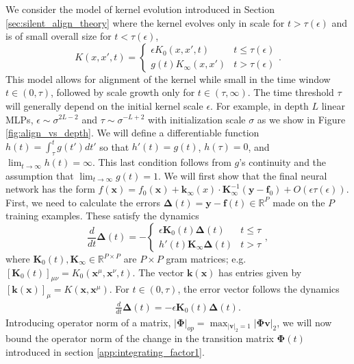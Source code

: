 \documentclass{article} %
\def\x{\bm x}
\begin{document}
\begin{appendix}
We consider the model of kernel evolution introduced in Section \ref{sec:silent_align_theory} where the kernel evolves only in scale for $t > \tau(\epsilon)$ and is of small overall size for $t < \tau(\epsilon)$,
\begin{equation}\label{eq:cases}
    K(x,x',t) = \begin{cases} 
      \epsilon K_0(x,x',t) & t \leq \tau(\epsilon) \\
      g(t) K_{\infty}(x,x') & t > \tau(\epsilon)
   \end{cases}.
\end{equation}
This model allows for alignment of the kernel while small in the time window $t \in (0,\tau)$, followed by scale growth only for $t \in (\tau,\infty)$. The time threshold $\tau$ will generally depend on the initial kernel scale $\epsilon$. For example, in depth $L$ linear MLPs, $\epsilon \sim \sigma^{2L-2}$ and $\tau \sim \sigma^{-L+2}$ with initialization scale $\sigma$ as we show in Figure \ref{fig:align_vs_depth}. We will define a differentiable function $h(t) = \int_{\tau}^t  g(t') dt'$ so that $h'(t) = g(t)$, $h(\tau) = 0$, and $\lim_{t\to\infty} h(t) = \infty$. This last condition follows from $g$'s continuity and the assumption that $\lim_{t\to\infty} g(t) = 1$. We will first show that the final neural network has the form $f(\x) = f_0(\x) +  \bm k_{\infty}(x) \cdot \bm K_{\infty}^{-1} (\bm y - \bm f_0) + O(\epsilon \tau(\epsilon))$. First, we need to calculate the errors $\bm\Delta(t) = \bm y - \bm f(t) \in \mathbb{R}^P$ made on the $P$ training examples. These satisfy the dynamics
\begin{equation}
    \frac{d}{dt} \bm \Delta(t)  = - \begin{cases} 
      \epsilon \bm K_0(t) \bm \Delta(t)  & t \leq \tau \\
      h'(t) \bm K_{\infty} \bm\Delta(t) & t > \tau
   \end{cases},
\end{equation}
where $\bm K_0(t), \bm K_{\infty} \in \mathbb{R}^{P \times P}$ are $P\times P$ gram matrices; e.g. $[\bm K_{0}(t)]_{\mu \nu} = K_0(\x^\mu,\x^\nu,t)$. The vector $\bm k(\x)$ has entries given by $[\bm k(\x)]_{\mu} = K(\x,\x^\mu)$. For $t \in (0,\tau)$, the error vector follows the dynamics
\begin{align}\label{eq:Delta_change}
    \frac{d}{dt} \bm\Delta(t) = - \epsilon \bm K_0(t) \bm\Delta(t).
\end{align}
Introducing operator norm of a matrix, $|\bm \Phi|_{op} = \max_{|\bm v|_2=1} |\bm \Phi \bm v|_2$, we will now bound the operator norm of the change in the transition matrix $\bm \Phi(t)$ introduced in section \ref{app:integrating_factor1}.

\end{appendix}
\end{document}
